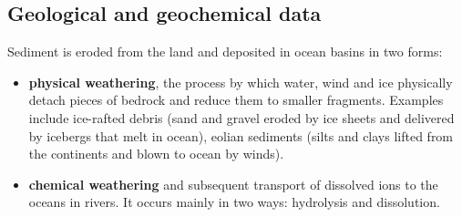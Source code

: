 \subsection{Geological and geochemical data}

Sediment is eroded from the land and deposited in ocean basins in two forms:
\begin{itemize}
	\item \textbf{physical weathering}, the process by which water, wind
	and ice physically detach pieces of bedrock and reduce them to smaller
	fragments. Examples include ice-rafted debris (sand and gravel eroded
	by ice sheets and delivered by icebergs that melt in ocean), eolian
	sediments (silts and clays lifted from the continents and blown to
	ocean by winds).
	\item \textbf{chemical weathering} and subsequent transport of
	dissolved ions to the oceans in rivers. It occurs mainly in two ways:
	hydrolysis and dissolution.
\end{itemize}
